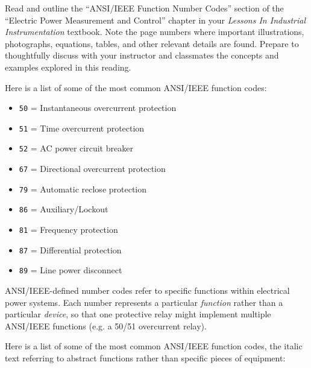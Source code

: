 

Read and outline the ``ANSI/IEEE Function Number Codes'' section of the ``Electric Power Measurement and Control'' chapter in your {\it Lessons In Industrial Instrumentation} textbook.  Note the page numbers where important illustrations, photographs, equations, tables, and other relevant details are found.  Prepare to thoughtfully discuss with your instructor and classmates the concepts and examples explored in this reading.






Here is a list of some of the most common ANSI/IEEE function codes:

\begin{itemize}
\item{} {\tt 50} = Instantaneous overcurrent protection
\item{} {\tt 51} = Time overcurrent protection
\item{} {\tt 52} = AC power circuit breaker
\item{} {\tt 67} = Directional overcurrent protection
\item{} {\tt 79} = Automatic reclose protection
\item{} {\tt 86} = Auxiliary/Lockout
\item{} {\tt 81} = Frequency protection
\item{} {\tt 87} = Differential protection
\item{} {\tt 89} = Line power disconnect
\end{itemize}







ANSI/IEEE-defined number codes refer to specific functions within electrical power systems.  Each number represents a particular {\it function} rather than a particular {\it device}, so that one protective relay might implement multiple ANSI/IEEE functions (e.g. a 50/51 overcurrent relay).

\vskip 10pt

Here is a list of some of the most common ANSI/IEEE function codes, the italic text referring to abstract functions rather than specific pieces of equipment:


